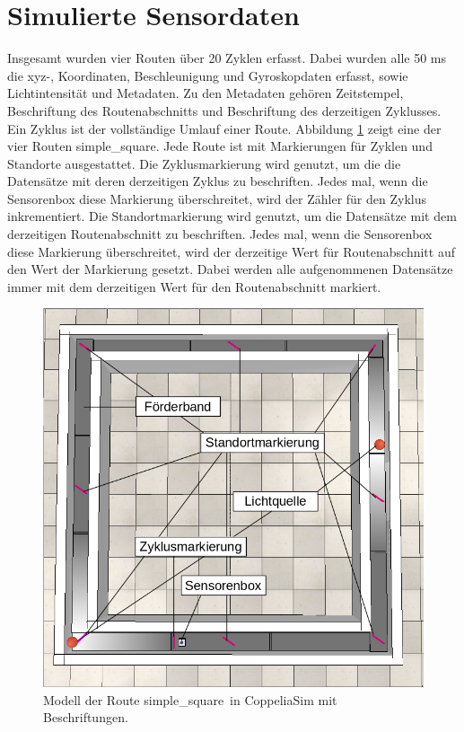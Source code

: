 \section{Simulierte Sensordaten}
Insgesamt wurden vier Routen über 20 Zyklen erfasst.
Dabei wurden alle 50 ms die xyz-, Koordinaten, Beschleunigung und Gyroskopdaten erfasst, sowie Lichtintensität und Metadaten.
Zu den Metadaten gehören Zeitstempel, Beschriftung des Routenabschnitts und Beschriftung des derzeitigen Zyklusses.
Ein Zyklus ist der vollständige Umlauf einer Route.
\newline
\newline
Abbildung \ref{fig:simple_square_labeled} zeigt eine der vier Routen \glqq simple\_square\grqq.
Jede Route ist mit Markierungen für Zyklen und Standorte ausgestattet.
Die Zyklusmarkierung wird genutzt, um die die Datensätze mit deren derzeitigen Zyklus zu beschriften.
Jedes mal, wenn die Sensorenbox diese Markierung überschreitet, wird der Zähler für den Zyklus inkrementiert.
Die Standortmarkierung wird genutzt, um die Datensätze mit dem derzeitigen Routenabschnitt zu beschriften.
Jedes mal, wenn die Sensorenbox diese Markierung überschreitet, wird der derzeitige Wert für Routenabschnitt auf den Wert der Markierung gesetzt.
Dabei werden alle aufgenommenen Datensätze immer mit dem derzeitigen Wert für den Routenabschnitt markiert.
\begin{figure}[h!]
    \centering
    \includegraphics[width=\linewidth]{images/simple_square_labeled.png}
    \caption{Modell der Route \glqq simple\_square\grqq\ in CoppeliaSim mit Beschriftungen.}
    \label{fig:simple_square_labeled}
\end{figure}
